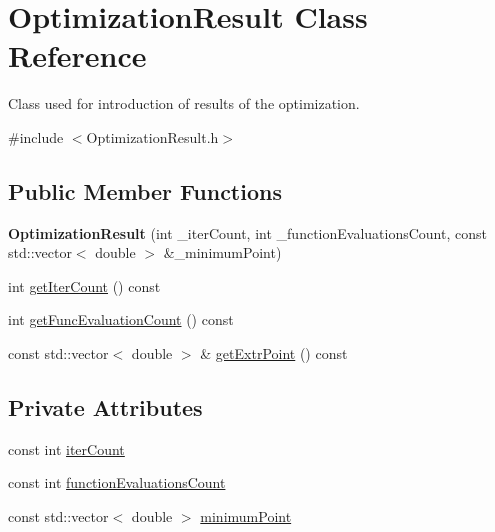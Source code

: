 \hypertarget{class_optimization_result}{}\section{Optimization\+Result Class Reference}
\label{class_optimization_result}


Class used for introduction of results of the optimization.  




{\ttfamily \#include $<$Optimization\+Result.\+h$>$}

\subsection*{Public Member Functions}
\begin{DoxyCompactItemize}
\item 
\mbox{\label{class_optimization_result_a53ac4a868e151c81b9f4cd163705c351}} 
{\bfseries Optimization\+Result} (int \+\_\+iter\+Count, int \+\_\+function\+Evaluations\+Count, const std\+::vector$<$ double $>$ \&\+\_\+minimum\+Point)
\item 
int \hyperlink{class_optimization_result_aab232c5a51fb404c8e1de38b533e617d}{get\+Iter\+Count} () const
\item 
int \hyperlink{class_optimization_result_a6f26683de442f45b95462b0dba44d737}{get\+Func\+Evaluation\+Count} () const
\item 
const std\+::vector$<$ double $>$ \& \hyperlink{class_optimization_result_a9f3d52b480c6538cd8a2da8aa127dfc8}{get\+Extr\+Point} () const
\end{DoxyCompactItemize}
\subsection*{Private Attributes}
\begin{DoxyCompactItemize}
\item 
const int \hyperlink{class_optimization_result_a2ab3b3a168bf73495f851f80d99ee3d7}{iter\+Count}
\item 
const int \hyperlink{class_optimization_result_af9b2136ff128f45202d8ad615c68cf96}{function\+Evaluations\+Count}
\item 
const std\+::vector$<$ double $>$ \hyperlink{class_optimization_result_a1d7ce65ebcdedc1d16d5365ca46d6e65}{minimum\+Point}
\end{DoxyCompactItemize}


